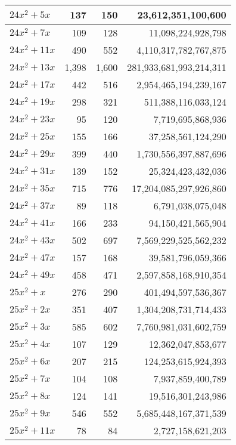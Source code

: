 \documentclass[a4paper]{amsproc}
\theoremstyle{plain}
\theoremstyle{named}
\begin{document}
\begin{longtable}{ | l | r | r | r | }
$24x^2 + 5x$ & 137 & 150 & 23{,}612{,}351{,}100{,}600 \\ \hline
$24x^2 + 7x$ & 109 & 128 & 11{,}098{,}224{,}928{,}798 \\ \hline
$24x^2 + 11x$ & 490 & 552 & 4{,}110{,}317{,}782{,}767{,}875 \\ \hline
$24x^2 + 13x$ & 1{,}398 & 1{,}600 & 281{,}933{,}681{,}993{,}214{,}311 \\ \hline
$24x^2 + 17x$ & 442 & 516 & 2{,}954{,}465{,}194{,}239{,}167 \\ \hline
$24x^2 + 19x$ & 298 & 321 & 511{,}388{,}116{,}033{,}124 \\ \hline
$24x^2 + 23x$ & 95 & 120 & 7{,}719{,}695{,}868{,}936 \\ \hline
$24x^2 + 25x$ & 155 & 166 & 37{,}258{,}561{,}124{,}290 \\ \hline
$24x^2 + 29x$ & 399 & 440 & 1{,}730{,}556{,}397{,}887{,}696 \\ \hline
$24x^2 + 31x$ & 139 & 152 & 25{,}324{,}423{,}432{,}036 \\ \hline
$24x^2 + 35x$ & 715 & 776 & 17{,}204{,}085{,}297{,}926{,}860 \\ \hline
$24x^2 + 37x$ & 89 & 118 & 6{,}791{,}038{,}075{,}048 \\ \hline
$24x^2 + 41x$ & 166 & 233 & 94{,}150{,}421{,}565{,}904 \\ \hline
$24x^2 + 43x$ & 502 & 697 & 7{,}569{,}229{,}525{,}562{,}232 \\ \hline
$24x^2 + 47x$ & 157 & 168 & 39{,}581{,}796{,}059{,}366 \\ \hline
$24x^2 + 49x$ & 458 & 471 & 2{,}597{,}858{,}168{,}910{,}354 \\ \hline
$25x^2 + x$ & 276 & 290 & 401{,}494{,}597{,}536{,}367 \\ \hline
$25x^2 + 2x$ & 351 & 407 & 1{,}304{,}208{,}731{,}714{,}433 \\ \hline
$25x^2 + 3x$ & 585 & 602 & 7{,}760{,}981{,}031{,}602{,}759 \\ \hline
$25x^2 + 4x$ & 107 & 129 & 12{,}362{,}047{,}853{,}677 \\ \hline
$25x^2 + 6x$ & 207 & 215 & 124{,}253{,}615{,}924{,}393 \\ \hline
$25x^2 + 7x$ & 104 & 108 & 7{,}937{,}859{,}400{,}789 \\ \hline
$25x^2 + 8x$ & 124 & 141 & 19{,}516{,}301{,}243{,}986 \\ \hline
$25x^2 + 9x$ & 546 & 552 & 5{,}685{,}448{,}167{,}371{,}539 \\ \hline
$25x^2 + 11x$ & 78 & 84 & 2{,}727{,}158{,}621{,}203 \\ \hline

\end{longtable}
\end{document}
